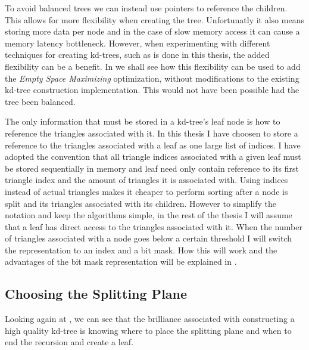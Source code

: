 To avoid balanced trees we can instead use pointers to reference the
children. This allows for more flexibility when creating the tree.  Unfortunatly
it also means storing more data per node and in the case of slow memory access
it can cause a memory latency bottleneck. However, when experimenting with
different techniques for creating kd-trees, such as is done in this thesis, the
added flexibility can be a benefit. In  we shall
see how this flexibility can be used to add the \textit{Empty Space Maximizing}
optimization, without modifications to the existing kd-tree construction
implementation. This would not have been possible had the tree been balanced.


The only information that must be stored in a kd-tree's leaf node is how to
reference the triangles associated with it. In this thesis I have choosen to
store a reference to the triangles associated with a leaf as one large list of
indices. I have adopted the convention that all triangle indices associated with
a given leaf must be stored sequentially in memory and leaf need only contain
reference to its first triangle index and the amount of triangles it is
associated with. Using indices instead of actual triangles makes it cheaper to
perform sorting after a node is split and its triangles associated with its
children. However to simplify the notation and keep the algorithms simple, in
the rest of the thesis I will assume that a leaf has direct access to the
triangles associated with it. When the number of triangles associated with a
node goes below a certain threshold I will switch the representation to an index
and a bit mask. How this will work and the advantages of the bit mask
representation will be explained in .


\subsection{Choosing the Splitting Plane}\label{sec:splittingPlane}


Looking again at , we can see that the brilliance
associated with constructing a high quality kd-tree is knowing where to place
the splitting plane and when to end the recursion and create a leaf.


